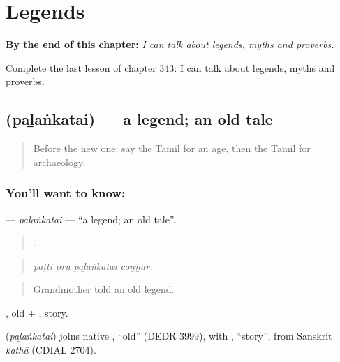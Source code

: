 
\chapter{Legends}
\label{ch:ta-legends}

\begin{chapteropening}
\textbf{By the end of this chapter:} \emph{I can talk about legends, myths and proverbs.}

Complete the last lesson of chapter 343: I can talk about legends, myths and proverbs.
\end{chapteropening}

\section[\texorpdfstring{\ta{பழங்கதை} (paḻaṅkatai)}{பழங்கதை (paḻaṅkatai)}]{ (paḻaṅkatai) — a legend; an old tale}

\label{lesson:TA-C343-palankatai}



\begin{quote}
Before the new one: say the Tamil for an age, then the Tamil for archaeology.
\end{quote}

\subsection*{You'll want to know: }
\textbf{} — \emph{paḻaṅkatai} — \textquotedblleft{}a legend; an old tale\textquotedblright{}.

\begin{quote}
   .
\end{quote}

\begin{quote}
\emph{pāṭṭi oru paḻaṅkatai coṉṉār.}
\end{quote}

\begin{quote}
Grandmother told an old legend.
\end{quote}

, old + , story.

\begin{cousinweb}
\textbf{} (\emph{paḻaṅkatai}) joins native , \textquotedblleft{}old\textquotedblright{} (DEDR 3999), with , \textquotedblleft{}story\textquotedblright{}, from Sanskrit \emph{kathā} (CDIAL 2704).
\end{cousinweb}

